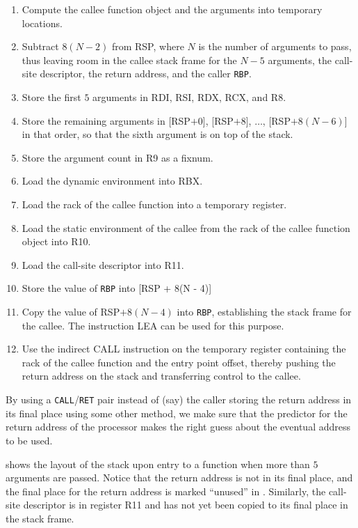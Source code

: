 \begin{enumerate}
\item Compute the callee function object and the arguments into
  temporary locations.
\item Subtract $8(N - 2)$ from RSP, where $N$ is the number of
  arguments to pass, thus leaving room in the callee stack frame for
  the $N - 5$ arguments, the call-site descriptor, the return address,
  and the caller \texttt{RBP}.
\item Store the first $5$ arguments in RDI, RSI, RDX, RCX, and R8.
\item Store the remaining arguments in [RSP$ + 0$], [RSP$ + 8$],
  $\ldots$, [RSP$ + 8(N - 6)$] in that order, so that the sixth
  argument is on top of the stack.
\item Store the argument count in R9 as a fixnum.
\item Load the dynamic environment into RBX.
\item Load the rack of the callee function into a temporary register.
\item Load the static environment of the callee from the rack of the
  callee function object into R10.
\item Load the call-site descriptor into R11.
\item Store the value of \texttt{RBP} into [RSP + 8(N - 4)]
\item Copy the value of RSP$ + 8(N - 4)$ into \texttt{RBP}, establishing the
  stack frame for the callee.  The instruction LEA can be used for
  this purpose.
\item Use the indirect CALL instruction on the temporary register
  containing the rack of the callee function and the entry point
  offset, thereby pushing the return address on the stack and
  transferring control to the callee.
\end{enumerate}

By using a \texttt{CALL}/\texttt{RET} pair instead of (say) the caller
storing the return address in its final place using some other method,
we make sure that the predictor for the return address of the
processor makes the right guess about the eventual address to be used.

 shows the layout of the stack
upon entry to a function when more than $5$ arguments are passed.
Notice that the return address is not in its final place, and the
final place for the return address is marked ``unused'' in
.  Similarly, the call-site
descriptor is in register R11 and has not yet been copied to its final
place in the stack frame.

